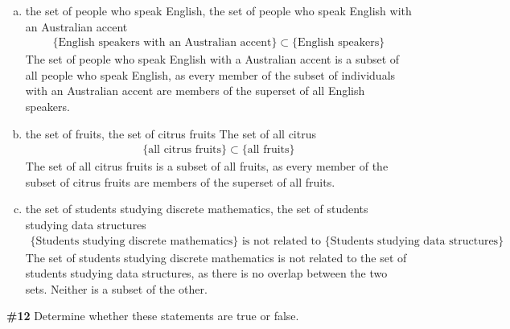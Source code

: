 \documentclass{article}
\newcommand{\problem}[1]{\textbf{\##1}}
\newcommand{\prob}[1]{\problem{#1}}
\begin{document}
\begin{enumerate}[a)]
    \item the set of people who speak English, the set of people who speak English with an Australian accent\\
    \begin{align*}
        \{\text{English speakers with an Australian accent}\} \subset \{\text{English speakers}\}
    \end{align*}
    The set of people who speak English with a Australian accent is a subset of all people who speak English, as every member of the subset of individuals with an Australian accent are members of the superset of all English speakers.
    \item the set of fruits, the set of citrus fruits
    The set of all citrus
    \begin{align*}
        \{\text{all citrus fruits}\} \subset \{\text{all fruits}\}
    \end{align*}
    The set of all citrus fruits is a subset of all fruits, as every member of the subset of citrus fruits are members of the superset of all fruits.
    \item the set of students studying discrete mathematics, the set of students studying data structures
    \begin{align*}
        \{\text{Students studying discrete mathematics}\} \text{ is not related to } \{\text{Students studying data structures}\}
    \end{align*}
    The set of students studying discrete mathematics is not related to the set of students studying data structures, as there is no overlap between the two sets. Neither is a subset of the other.
\end{enumerate}
\pagebreak
\prob{12} Determine whether these statements are true or false.
\end{document}
